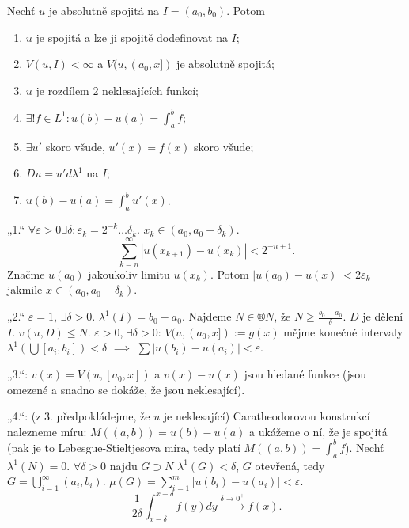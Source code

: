 \documentclass[12pt]{article}					%
\begin{document}
\begin{veta}
	Nechť $u$ je absolutně spojitá na $I = (a_0, b_0)$. Potom
	\begin{enumerate}
		\item $u$ je spojitá a lze ji spojitě dodefinovat na $\overline{I}$;
		\item $V(u, I) < ∞$ a $V(u, (a_0, x])$ je absolutně spojitá;
		\item $u$ je rozdílem 2 neklesajících funkcí;
		\item $\exists! f \in L^1: u(b) - u(a) = \int_a^b f$;
		\item $\exists u'$ skoro všude, $u'(x) = f(x)$ skoro všude;
		\item $Du = u' dλ^1$ na $I$;
		\item $u(b) - u(a) = \int_a^b u'(x)$.
	\end{enumerate}

	\begin{dukazin}
		„1.“ $\forall ε > 0 \exists δ: ε_k = 2^{-k} … δ_k$. $x_k \in (a_0, a_0 + δ_k)$.
		$$ \sum_{k=n}^∞ |u(x_{k + 1}) - u(x_k)| < 2^{-n + 1}. $$
		Značme $u(a_0)$ jakoukoliv limitu $u(x_k)$. Potom $|u(a_0) - u(x)| < 2ε_k$ jakmile $x \in (a_0, a_0 + δ_k)$.

		„2.“ $ε = 1$, $\exists δ > 0$. $λ^1(I) = b_0 - a_0$. Najdeme $N \in ®N$, že $N ≥ \frac{b_0 - a_0}{δ}$. $D$ je dělení $I$. $v(u, D) ≤ N$. $ε > 0$, $\exists δ > 0$: $V(u, (a_0, x]) := g(x)$ mějme konečné intervaly $λ^1(\bigcup [a_i, b_i]) < δ$ $\implies$ $\sum |u(b_i) - u(a_i)| < ε$.

		„3.“: $v(x) = V(u, [a_0, x])$ a $v(x) - u(x)$ jsou hledané funkce (jsou omezené a snadno se dokáže, že jsou neklesající).

		„4.“: (z 3. předpokládejme, že $u$ je neklesající) Caratheodorovou konstrukcí nalezneme míru: $M((a, b)) = u(b) - u(a)$ a ukážeme o ní, že je spojitá (pak je to Lebesgue-Stieltjesova míra, tedy platí $M((a, b)) = \int_a^b f$). Nechť $λ^1(N) = 0$. $\forall δ > 0$ najdu $G \supset N$ $λ^1(G) < δ$, $G$ otevřená, tedy $G = \bigcup_{i=1}^∞(a_i, b_i)$. $μ(G) = \sum_{i=1}^m |u(b_i) - u(a_i)| < ε$.
		$$ \frac{1}{2δ} \int_{x - δ}^{x + δ} f(y) dy \overset{δ \rightarrow 0^+}\longrightarrow f(x). $$

	\end{dukazin}
\end{veta}

\break
\end{document}
